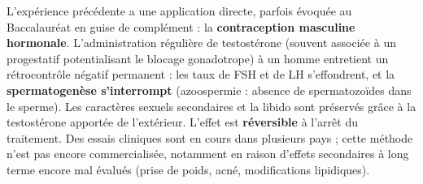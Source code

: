 \documentclass[11pt]{article}
\begin{document}
\begin{savaistu}
L'expérience précédente a une application directe, parfois évoquée au Baccalauréat en guise de complément : la \textbf{contraception masculine hormonale}. L'administration régulière de testostérone (souvent associée à un progestatif potentialisant le blocage gonadotrope) à un homme entretient un rétrocontrôle négatif permanent : les taux de FSH et de LH s'effondrent, et la \textbf{spermatogenèse s'interrompt} (azoospermie : absence de spermatozoïdes dans le sperme). Les caractères sexuels secondaires et la libido sont préservés grâce à la testostérone apportée de l'extérieur. L'effet est \textbf{réversible} à l'arrêt du traitement. Des essais cliniques sont en cours dans plusieurs pays ; cette méthode n'est pas encore commercialisée, notamment en raison d'effets secondaires à long terme encore mal évalués (prise de poids, acné, modifications lipidiques).
\end{savaistu}
\end{document}
